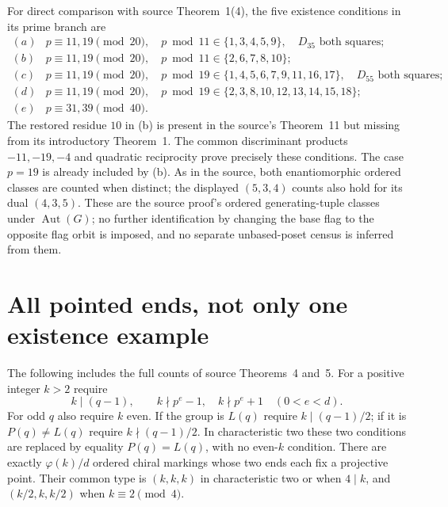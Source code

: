 \documentclass[11pt,a4paper]{article}
\begin{document}
For direct comparison with source Theorem~1(4), the five existence
conditions in its prime branch are
\[
\begin{array}{c|l}
(a)&p\equiv11,19\pmod{20},\quad
 p\bmod11\in\{1,3,4,5,9\},\quad D_{35}\text{ both squares};\\
(b)&p\equiv11,19\pmod{20},\quad
 p\bmod11\in\{2,6,7,8,10\};\\
(c)&p\equiv11,19\pmod{20},\quad
 p\bmod19\in\{1,4,5,6,7,9,11,16,17\},\quad D_{55}\text{ both squares};\\
(d)&p\equiv11,19\pmod{20},\quad
 p\bmod19\in\{2,3,8,10,12,13,14,15,18\};\\
(e)&p\equiv31,39\pmod{40}.
\end{array}
\]
The restored residue $10$ in (b) is present in the source's Theorem~11
but missing from its introductory Theorem~1. The common discriminant
products $-11,-19,-4$ and quadratic reciprocity prove precisely these
conditions. The case $p=19$ is already included by (b). As in the
source, both enantiomorphic ordered classes are counted when distinct;
the displayed $(5,3,4)$ counts also hold for its dual $(4,3,5)$.
These are the source proof's ordered generating-tuple classes under
$\operatorname{Aut}(G)$; no further identification by changing the
base flag to the opposite flag orbit is imposed, and no separate
unbased-poset census is inferred from them.

\section{All pointed ends, not only one existence example}
The following includes the full counts of source Theorems~4 and~5.
For a positive integer $k>2$ require
\[
 k\mid(q-1),\qquad k\nmid p^e-1,\quad k\nmid p^e+1
       \quad(0<e<d).
\]
For odd $q$ also require $k$ even. If the group is $L(q)$ require
$k\mid(q-1)/2$; if it is $P(q)\ne L(q)$ require
$k\nmid(q-1)/2$. In characteristic two these two conditions are
replaced by equality $P(q)=L(q)$, with no even-$k$ condition.
There are exactly $\varphi(k)/d$ ordered chiral markings whose two
ends each fix a projective point. Their common type is
$(k,k,k)$ in characteristic two or when $4\mid k$, and
$(k/2,k,k/2)$ when $k\equiv2\pmod4$.
\end{document}

